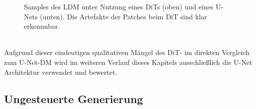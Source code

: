 \begin{figure}[htbp]
    \centering
    
    \vspace{-8pt}

    \caption{Samples des \ac{LDM} unter Nutzung eines \ac{DiT}s (oben) und eines U-Nets (unten). Die Artefakte der Patches beim \ac{DiT} sind klar erkennnbar.}
    \label{fig:dit_unet_results}
\end{figure} \\
Aufgrund dieser eindeutigen qualitativen Mängel des \ac{DiT}- im direkten Vergleich zum U-Net-\ac{DM} wird im weiteren Verlauf dieses Kapitels ausschließlich die U-Net Architektur verwendet und bewertet. 


\subsection {Ungesteuerte Generierung}
\label{subsec:unconditional_results}


